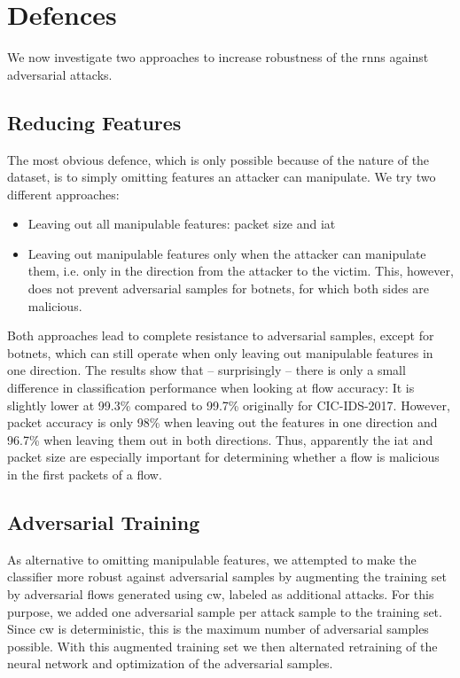 \documentclass[conference]{IEEEtran}
\begin{document}
\section{Defences}
We now investigate two approaches to increase robustness of the \glspl{rnn} against adversarial attacks.
\subsection{Reducing Features}
The most obvious defence, which is only possible because of the nature of the dataset, is to simply omitting features an attacker can manipulate. We try two different approaches:
\begin{itemize}[topsep=0pt,wide,labelwidth=!,labelindent=0pt]
\item Leaving out all manipulable features: packet size and \gls{iat}
\item Leaving out manipulable features only when the attacker can manipulate them, i.e. only in the direction from the attacker to the victim. This, however, does not prevent adversarial samples for botnets, for which both sides are malicious.
\end{itemize}

Both approaches lead to complete resistance to adversarial samples, except for botnets, which can still operate when only leaving out manipulable features in one direction. The results show that -- surprisingly -- there is only a small difference in classification performance when looking at flow accuracy: It is slightly lower at 99.3\% compared to 99.7\% originally for CIC-IDS-2017. However, packet accuracy is only 98\% when leaving out the features in one direction and 96.7\% when leaving them out in both directions. Thus, apparently the \gls{iat} and packet size are especially important for determining whether a flow is malicious in the first packets of a flow.

\subsection{Adversarial Training}
As alternative to omitting manipulable features, we attempted to make the classifier more robust against adversarial samples by augmenting the training set by adversarial flows generated using  \gls{cw}, labeled as additional attacks.
For this purpose, we added one adversarial sample per attack sample to the training set. Since \gls{cw} is deterministic, this is the maximum number of adversarial samples possible. With this augmented training set we then alternated retraining of the neural network and optimization of the adversarial samples. %
\end{document}
